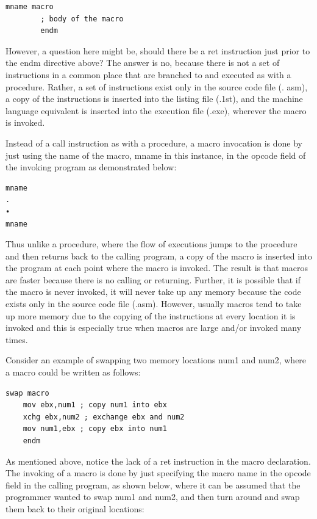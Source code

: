 \documentclass[10pt]{article}
\begin{document}
\begin{verbatim}
mname macro
        ; body of the macro
        endm
\end{verbatim}

However, a question here might be, should there be a ret instruction just prior to the endm directive above? The answer is no, because there is not a set of instructions in a common place that are branched to and executed as with a procedure. Rather, a set of instructions exist only in the source code file (. asm), a copy of the instructions is inserted into the listing file (.1st), and the machine language equivalent is inserted into the execution file (.exe), wherever the macro is invoked.

Instead of a call instruction as with a procedure, a macro invocation is done by just using the name of the macro, mname in this instance, in the opcode field of the invoking program as demonstrated below:

\begin{verbatim}
mname
.
•
mname
\end{verbatim}

Thus unlike a procedure, where the flow of executions jumps to the procedure and then returns back to the calling program, a copy of the macro is inserted into the program at each point where the macro is invoked. The result is that macros are faster because there is no calling or returning. Further, it is possible that if the macro is never invoked, it will never take up any memory because the code exists only in the source code file (.asm). However, usually macros tend to take up more memory due to the copying of the instructions at every location it is invoked and this is especially true when macros are large and/or invoked many times.

Consider an example of swapping two memory locations num1 and num2, where a macro could be written as follows:

\begin{verbatim}
swap macro
    mov ebx,num1 ; copy num1 into ebx
    xchg ebx,num2 ; exchange ebx and num2
    mov num1,ebx ; copy ebx into num1
    endm
\end{verbatim}

As mentioned above, notice the lack of a ret instruction in the macro declaration. The invoking of a macro is done by just specifying the macro name in the opcode field in the calling program, as shown below, where it can be assumed that the programmer wanted to swap num1 and num2, and then turn around and swap them back to their original locations:
\end{document}
